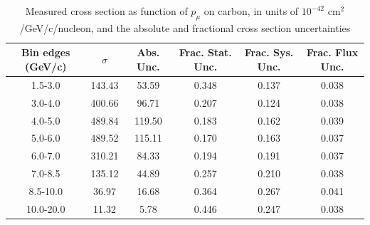 \documentclass[../main.tex]{subfiles}
\begin{document}
\begin{table}
  \centering
  \renewcommand{\arraystretch}{1.15}
  \caption{Measured cross section as function of $p_{\mu}$ on carbon, in units of $10^{-42}$ $\text{cm}^2$/GeV/c/nucleon, and the absolute and fractional cross section uncertainties}
    \begin{tabular}{c||c|c||c|c|c}
      Bin edges (GeV/c) &  $\sigma$  &  Abs. Unc.  &  Frac. Stat. Unc.  &  Frac. Sys. Unc.  &  Frac. Flux Unc. \\
      \hline
      \hline
      1.5-3.0 & 143.43 & 53.59 & 0.348 & 0.137 & 0.038\\
      3.0-4.0 & 400.66 & 96.71 & 0.207 & 0.124 & 0.038\\
      4.0-5.0 & 489.84 & 119.50 & 0.183 & 0.162 & 0.039\\
      5.0-6.0 & 489.52 & 115.11 & 0.170 & 0.163 & 0.037\\
      6.0-7.0 & 310.21 & 84.33 & 0.194 & 0.191 & 0.037\\
      7.0-8.5 & 135.12 & 44.89 & 0.257 & 0.210 & 0.038\\
      8.5-10.0 & 36.97 & 16.68 & 0.364 & 0.267 & 0.041\\
      10.0-20.0 & 11.32 & 5.78 & 0.446 & 0.247 & 0.038
    \end{tabular}
  \label{tbl:datanucleonnuc6muon_pa}
\end{table}
\begin{table}
  \centering
  \renewcommand{\arraystretch}{1.15}
  \caption{Statistical covariance matrix of measured cross section as function of $p_{\mu}$ on carbon, in units of $10^{-84}$ $(\text{cm}^2$/GeV/c/nucleon$)^2$}
  \label{tbl:statnucleonnuc6muon_pb}
\end{table}
\end{document}
